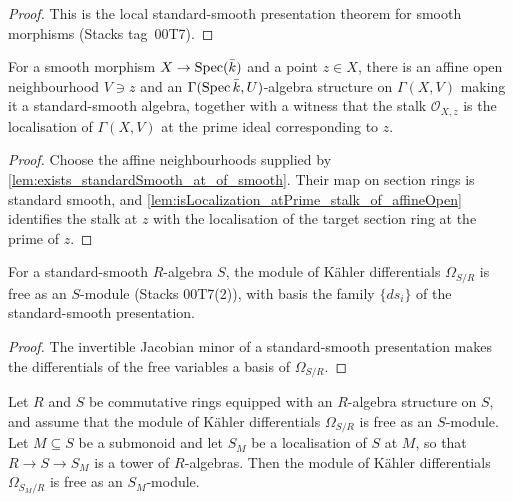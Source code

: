 \begin{proof}
  This is the local standard-smooth presentation theorem for smooth morphisms
  (Stacks tag~00T7).
\end{proof}

\begin{lemma}\leanok
  \label{lem:exists_algebra_standardSmooth_stalk_localization}
  For a smooth morphism \(X \to \operatorname{Spec}(\bar k)\) and a point \(z \in X\), there is
  an affine open neighbourhood \(V \ni z\) and an \(\Gamma(\operatorname{Spec} \bar k, U)\)-algebra
  structure on \(\Gamma(X, V)\) making it a standard-smooth algebra, together with a
  witness that the stalk \(\mathcal O_{X, z}\) is the localisation of \(\Gamma(X, V)\)
  at the prime ideal corresponding to \(z\).
\end{lemma}

\begin{proof}
  Choose the affine neighbourhoods supplied by
  \cref{lem:exists_standardSmooth_at_of_smooth}.  Their map on section rings is
  standard smooth, and
  \cref{lem:isLocalization_atPrime_stalk_of_affineOpen} identifies the stalk at
  \(z\) with the localisation of the target section ring at the prime of \(z\).
\end{proof}

\begin{lemma}\leanok
  \label{lem:module_free_kaehler_standardSmooth}
  For a standard-smooth \(R\)-algebra \(S\), the module of K\"ahler differentials
  \(\Omega_{S/R}\) is free as an \(S\)-module (Stacks 00T7(2)), with basis the family
  \(\{ds_i\}\) of the standard-smooth presentation.
\end{lemma}

\begin{proof}
  The invertible Jacobian minor of a standard-smooth presentation makes the
  differentials of the free variables a basis of \(\Omega_{S/R}\).
\end{proof}

\begin{lemma}\leanok
  \label{lem:module_free_kaehler_localization}
  Let \(R\) and \(S\) be commutative rings equipped with an \(R\)-algebra
  structure on \(S\), and assume that the module of K\"ahler differentials
  \(\Omega_{S/R}\) is free as an \(S\)-module. Let \(M \subseteq S\) be a
  submonoid and let \(S_M\) be a localisation of \(S\) at \(M\), so that
  \(R \to S \to S_M\) is a tower of \(R\)-algebras. Then the module of
  K\"ahler differentials \(\Omega_{S_M / R}\) is free as an
  \(S_M\)-module.
\end{lemma}

